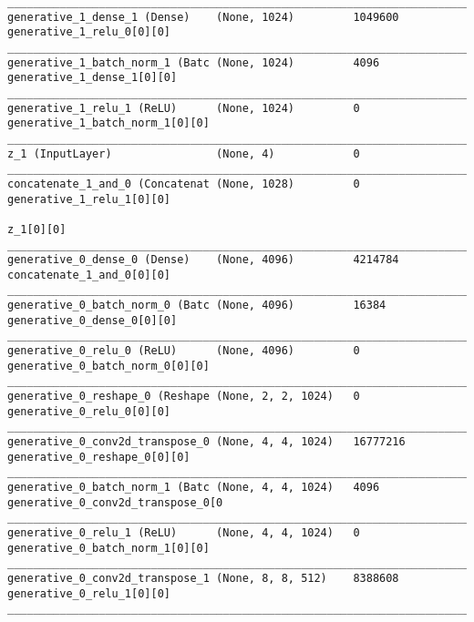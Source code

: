 \begin{lstlisting}[caption={dSprites-VLAE-GAN Decoder},captionpos=b,basicstyle=\tiny, label={lst:mnist-vlae-gan-decoder}]
__________________________________________________________________________________________________
generative_1_dense_1 (Dense)    (None, 1024)         1049600     generative_1_relu_0[0][0]
__________________________________________________________________________________________________
generative_1_batch_norm_1 (Batc (None, 1024)         4096        generative_1_dense_1[0][0]
__________________________________________________________________________________________________
generative_1_relu_1 (ReLU)      (None, 1024)         0           generative_1_batch_norm_1[0][0]
__________________________________________________________________________________________________
z_1 (InputLayer)                (None, 4)            0
__________________________________________________________________________________________________
concatenate_1_and_0 (Concatenat (None, 1028)         0           generative_1_relu_1[0][0]
                                                                 z_1[0][0]
__________________________________________________________________________________________________
generative_0_dense_0 (Dense)    (None, 4096)         4214784     concatenate_1_and_0[0][0]
__________________________________________________________________________________________________
generative_0_batch_norm_0 (Batc (None, 4096)         16384       generative_0_dense_0[0][0]
__________________________________________________________________________________________________
generative_0_relu_0 (ReLU)      (None, 4096)         0           generative_0_batch_norm_0[0][0]
__________________________________________________________________________________________________
generative_0_reshape_0 (Reshape (None, 2, 2, 1024)   0           generative_0_relu_0[0][0]
__________________________________________________________________________________________________
generative_0_conv2d_transpose_0 (None, 4, 4, 1024)   16777216    generative_0_reshape_0[0][0]
__________________________________________________________________________________________________
generative_0_batch_norm_1 (Batc (None, 4, 4, 1024)   4096        generative_0_conv2d_transpose_0[0
__________________________________________________________________________________________________
generative_0_relu_1 (ReLU)      (None, 4, 4, 1024)   0           generative_0_batch_norm_1[0][0]
__________________________________________________________________________________________________
generative_0_conv2d_transpose_1 (None, 8, 8, 512)    8388608     generative_0_relu_1[0][0]
__________________________________________________________________________________________________

\end{lstlisting}
